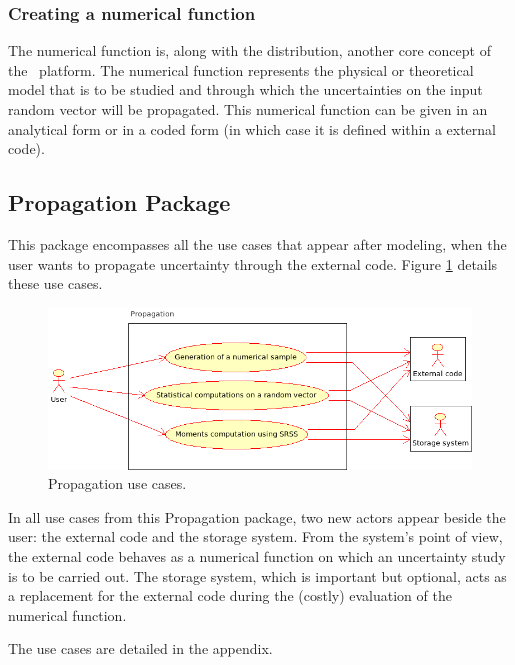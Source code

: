 \subsubsection{Creating a numerical function}

The numerical function is, along with the distribution, another core concept of the \OT\ platform. The numerical function represents the physical or theoretical model that is to be studied and through which the uncertainties on the input random vector will be propagated. This numerical function can be given in an analytical form or in a coded form (in which case it is defined within a external code).

\subsection{Propagation Package}

This package encompasses all the use cases that appear after modeling, when the user wants to propagate uncertainty through the external code. Figure \ref{fig:propagation} details these use cases.

\begin{figure}[htb]
  \begin{center}
    \includegraphics[scale=0.5]{Figures/analysis/propagation.png}
    \caption{Propagation use cases.}\label{fig:propagation}
  \end{center}
\end{figure}

In all use cases from this Propagation package, two new actors appear beside the user: the external code and the storage system. From the system's point of view, the external code behaves as a numerical function on which an uncertainty study is to be carried out. The storage system, which is important but optional, acts as a replacement for the external code during the (costly) evaluation of the numerical function.

The use cases are detailed in the appendix.

